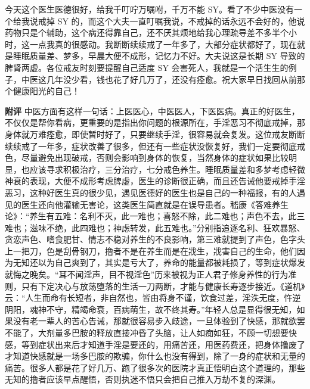 \begin{case}
    今天这个医生医德很好，给我千叮咛万嘱咐，千万不能 SY。看了不少中医没有一个给我说戒掉 SY 的，而这个大夫一直叮嘱我说，不戒掉的话永远不会好的，他说药物只是个辅助，这个病还得靠自己，还不厌其烦地给我心理疏导差不多半个小时，这一点我真的很感动。我断断续续戒了一年多了，大部分症状都好了，现在就是睡眠质量差、梦多，早晨大便不成形，记忆力不好。大夫说这是长期 SY 导致的脾肾两虚。各位戒友时刻要提醒自己适度 SY 会害死人，我就是一个活生生的例子，中医这几年没少看，钱也花了好几万了，还没有痊愈。祝大家早日找回从前那个健康阳光的自己！

    \textbf{附评} 中医方面有这样一句话：上医医心，中医医人，下医医病。真正的好医生，不仅仅是帮你看病，更重要的是指出你问题的根源所在，手淫恶习不彻底戒掉，那身体就万难痊愈，即使暂时好了，只要继续手淫，很容易就会复发。这位戒友断断续续戒了一年多，症状改善了很多，但还有一些症状没恢复好，我们一定要彻底戒色，尽量避免出现破戒，否则会影响到身体的恢复，当然身体的症状如果比较明显，也应该寻求积极治疗，三分治疗，七分戒色养生。睡眠质量差和多梦考虑轻微神衰的表现，大便不成形考虑脾虚，医生的诊断很正确，而且还告诫他要戒掉手淫恶习，这种好医生真的很少见，遇见医德好的医生也是自己的一种福报，有的人遇见的医生还向他灌输无害论，这类医生简直就是在误导患者。嵇康《答难养生论》：“养生有五难：名利不灭，此一难也；喜怒不除，此二难也；声色不去，此三难也；滋味不绝，此四难也；神虑转发，此五难也。”分别指追逐名利、狂欢暴怒、贪恋声色、嗜食肥甘、情志不稳对养生的不良影响，第三难就提到了声色，色字头上一把刀，色是刮骨钢刀，撸者不是在养生而是在戕生，戕害自己的生命，他们因为无知还以为自己爽到了，其实是亏大了，养命的能量都被耗损了，等到症状爆发就悔之晚矣。“耳不闻淫声，目不视淫色”历来被视为正人君子修身养性的行为准则，只有下定决心与放荡堕落的生活一刀两断，才能与健康长寿逐步接近。《道机》云：“人生而命有长短者，非自然也，皆由将身不谨，饮食过差，淫泆无度，忤逆阴阳，魂神不守，精竭命衰，百病萌生，故不终其寿。”年轻人总是显得很无知，如果没有老一辈人的苦心告诫，那就很容易步入歧途，一旦体验到了快感，那就欲罢不能了，大剂量多巴胺的释放直接冲昏了头脑，让人如痴如狂，不顾一切想要快感，等到症状出来后才知道手淫是要还的，用痛苦还，用医药费还，把身体撸废了才知道快感就是一场多巴胺的欺骗，你什么也没有得到，除了一身的症状和无量的痛苦。很多人都是花了好几万、跑了很多次的医院才真正悟明白这个道理的，那些无知的撸者应该早点醒悟，否则执迷不悟只会把自己推入万劫不复的深渊。
\end{case}

